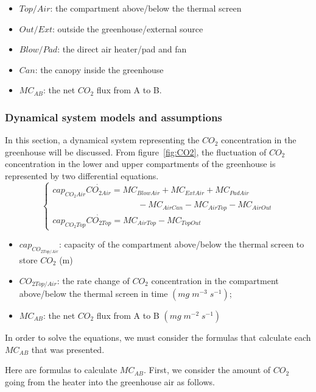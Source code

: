 \documentclass[a4paper]{article}
\numberwithin{equation}{section}
\begin{document}
\begin{itemize}
  \item \(Top/Air\): the compartment above/below the thermal screen
  \item	\(Out/Ext\): outside the greenhouse/external source
  \item \(Blow/Pad\): the direct air heater/pad and fan
  \item \(Can\): the canopy inside the greenhouse
  \item \(MC_{AB}\): the net \(CO_2\) flux from A to B.
\end{itemize}


\subsubsection{Dynamical system models and assumptions}
In this section, a dynamical system representing the \(CO_2\) concentration in the greenhouse will be discussed. From figure~\ref{fig:CO2}, the fluctuation of \(CO_2\) concentration in the lower and upper compartments of the greenhouse is represented by two differential equations.
\begin{equation}
  \begin{cases}
    cap_{CO_2 Air}\dot{CO_{2 Air}} = MC_{BlowAir} + MC_{ExtAir} + MC_{PadAir} \\ \qquad \qquad \qquad \qquad \qquad
    - MC_{AirCan} - MC_{AirTop} - MC_{AirOut}                                 \\
    cap_{CO_2 Top}\dot{CO_{2 Top}} = MC_{AirTop} - MC_{TopOut}
  \end{cases}
\end{equation}
\begin{itemize}
  \item \(cap_{CO_{2Top/Air}}\): capacity of the compartment above/below the thermal screen to store \(CO_2\) (m)
  \item	\(CO_{2Top/Air}\): the rate change of \(CO_2\) concentration in the compartment above/below the thermal screen in time \((mg\;m^{-3}\;s^{-1})\);
  \item \(MC_{AB}\): the net \(CO_2\) flux from A to B \((mg\;m^{-2}\;s^{-1})\)
\end{itemize}


In order to solve the equations, we must consider the formulas that calculate each \(MC_{AB}\) that was presented.

Here are formulas to calculate \(MC_{AB}\). First, we consider the amount of \(CO_2\) going from the heater into the greenhouse air as follows.
\end{document}
